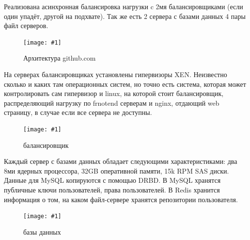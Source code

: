 \documentclass{article}
\begin{document}

\newcommand{\diaa}[2]{
    \begin{figure}[!h]
        \texttt{[image: \#1]}
        \caption{#2}
    \end{figure}
}
Реализована асинхронная балансировка нагрузки c 2мя балансировщиками (если один упадёт, другой на подхвате). Так же есть 2 сервера с базами данных 4 пары файл серверов.
\diaa{diags/1.png}{Архитектура github.com \cite{github}}

На серверах балансировщиках установлены гипервизоры XEN. Неизвестно сколько и каких там операционных систем, но точно есть система, которая может контролировать сам гипервизор и linux, на которой стоит балансировщик, распределяющий нагрузку по frnotend серверам и nginx, отдающий web страницу, в случае если все сервера не доступны.
\diaa{diags/2.png}{балансировщик \cite{github,nmap_github}}
\pagebreak

Каждый сервер с базами данных обладает следующими характеристиками:
два 8ми ядерных процессора, 32GB оперативной памяти, 15k RPM SAS диски. Данные для MySQL копируются с помощью DRBD.
В MySQL хранятся публичные ключи пользователей, права пользователей.
В Redis хранится информация о том, на каком файл-сервере хранятся репозитории пользователя.
\diaa{diags/databases.png}{базы данных \cite{github}}
\end{document}
